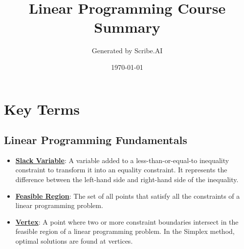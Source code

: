 \documentclass{article}%
\title{Linear Programming Course Summary}%
\author{Generated by Scribe.AI}%
\date{\today}%
\begin{document}
%
\normalsize%
\maketitle%
\section{Key Terms}%
\label{sec:KeyTerms}%
\subsection{Linear Programming Fundamentals}%
\label{subsec:LinearProgrammingFundamentals}%
\begin{itemize}[leftmargin=*]%
\item \href{https://www.math.purdue.edu/~yipn/421/2024-08-27-ExSimplex.pdf#page=1}{\textbf{Slack Variable}}: A variable added to a less-than-or-equal-to inequality constraint to transform it into an equality constraint. It represents the difference between the left-hand side and right-hand side of the inequality.%
\item \href{https://www.math.purdue.edu/~yipn/421/2024-08-27-ExSimplex.pdf#page=4}{\textbf{Feasible Region}}: The set of all points that satisfy all the constraints of a linear programming problem.%
\item \href{https://www.math.purdue.edu/~yipn/421/2024-08-27-ExSimplex.pdf#page=5}{\textbf{Vertex}}: A point where two or more constraint boundaries intersect in the feasible region of a linear programming problem. In the Simplex method, optimal solutions are found at vertices.%
\end{itemize}

%
\end{document}
